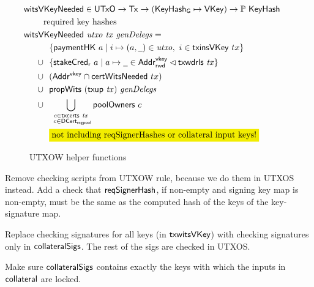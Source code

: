 \begin{figure}[htb]
  \begin{align*}
    & \hspace{-0.8cm}\fun{witsVKeyNeeded} \in \UTxO \to \Tx \to (\KeyHashGen\mapsto\VKey) \to
      \powerset{\KeyHash} \\
    & \text{required key hashes} \\
    &  \hspace{-0.8cm}\fun{witsVKeyNeeded}~\var{utxo}~\var{tx}~\var{genDelegs} = \\
    & ~~\{ \fun{paymentHK}~a \mid i \mapsto (a, \wcard) \in \var{utxo},~i\in\fun{txinsVKey}~{tx} \} \\
    \cup & ~~
           \{\fun{stakeCred_r}~a\mid a\mapsto \wcard \in \AddrRWDVKey
      \restrictdom \txwdrls{tx}\}\\
    \cup & ~~(\AddrVKey \cap \fun{certWitsNeeded}~{tx}) \\
    \cup & ~~\fun{propWits}~(\fun{txup}~\var{tx})~\var{genDelegs} \\
    \cup & ~~\bigcup_{\substack{c \in \txcerts{tx} \\ ~c \in\DCertRegPool}} \fun{poolOwners}~{c} \\
    & ~~\hldiff{\text{not including reqSignerHashes or collateral input keys!}}
  \end{align*}
  \caption{UTXOW helper functions}
  \label{fig:functions-witnesses}
\end{figure}

Remove checking scripts from UTXOW rule, because we do them in UTXOS instead.
Add a check that $\mathsf{reqSignerHash}$, if non-empty and signing key map is non-empty,
must be the same as the computed hash of the keys of the key-signature map.

Replace checking signatures for all keys (in $\mathsf{txwitsVKey}$) with checking
signatures only in $\mathsf{collateralSigs}$. The rest of the sigs are checked in UTXOS.

Make sure $\mathsf{collateralSigs}$ contains exactly the keys with which the
inputs in $\mathsf{collateral}$ are locked.

